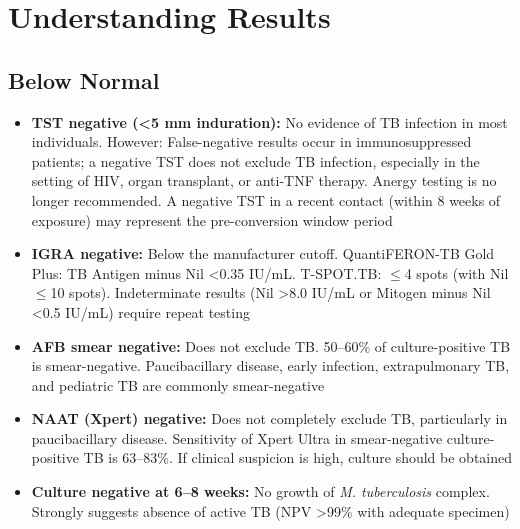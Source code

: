 \section*{Understanding Results}

\subsection*{Below Normal}
\begin{itemize}
  \item \textbf{TST negative (<5 mm induration):} No evidence of TB infection in most individuals. However: False-negative results occur in immunosuppressed patients; a negative TST does not exclude TB infection, especially in the setting of HIV, organ transplant, or anti-TNF therapy. Anergy testing is no longer recommended. A negative TST in a recent contact (within 8 weeks of exposure) may represent the pre-conversion window period
  \item \textbf{IGRA negative:} Below the manufacturer cutoff. QuantiFERON-TB Gold Plus: TB Antigen minus Nil <0.35 IU/mL. T-SPOT.TB: $\leq$4 spots (with Nil $\leq$10 spots). Indeterminate results (Nil >8.0 IU/mL or Mitogen minus Nil <0.5 IU/mL) require repeat testing
  \item \textbf{AFB smear negative:} Does not exclude TB. 50--60\% of culture-positive TB is smear-negative. Paucibacillary disease, early infection, extrapulmonary TB, and pediatric TB are commonly smear-negative
  \item \textbf{NAAT (Xpert) negative:} Does not completely exclude TB, particularly in paucibacillary disease. Sensitivity of Xpert Ultra in smear-negative culture-positive TB is 63--83\%. If clinical suspicion is high, culture should be obtained
  \item \textbf{Culture negative at 6--8 weeks:} No growth of \textit{M. tuberculosis} complex. Strongly suggests absence of active TB (NPV >99\% with adequate specimen)
\end{itemize}


